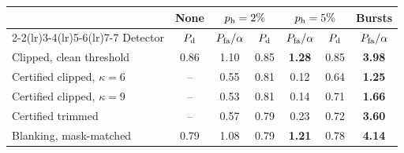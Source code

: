 \begin{tabular}{lcccccc}
\toprule
 & None & \multicolumn{2}{c}{$p_{\rm h}=2\%$} & \multicolumn{2}{c}{$p_{\rm h}=5\%$} & Bursts\\
\cmidrule(lr){2-2}\cmidrule(lr){3-4}\cmidrule(lr){5-6}\cmidrule(lr){7-7}
 Detector & $P_{\rm d}$ & $P_{\rm fa}/\alpha$ & $P_{\rm d}$ & $P_{\rm fa}/\alpha$ & $P_{\rm d}$ & $P_{\rm fa}/\alpha$\\
\midrule
Clipped, clean threshold & 0.86 & 1.10 & 0.85 & \textbf{1.28} & 0.85 & \textbf{3.98}\\
Certified clipped, $\kappa=6$ & -- & 0.55 & 0.81 & 0.12 & 0.64 & \textbf{1.25}\\
Certified clipped, $\kappa=9$ & -- & 0.53 & 0.81 & 0.14 & 0.71 & \textbf{1.66}\\
Certified trimmed & -- & 0.57 & 0.79 & 0.23 & 0.72 & \textbf{3.60}\\
Blanking, mask-matched & 0.79 & 1.08 & 0.79 & \textbf{1.21} & 0.78 & \textbf{4.14}\\
\bottomrule
\end{tabular}
